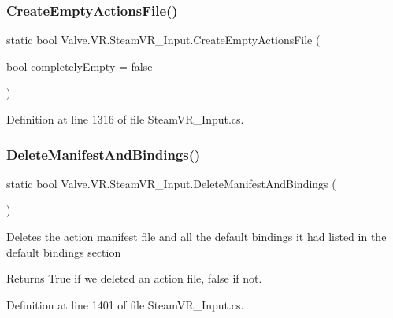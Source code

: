 \subsubsection{\texorpdfstring{CreateEmptyActionsFile()}{CreateEmptyActionsFile()}}
{\footnotesize\ttfamily static bool Valve.\+V\+R.\+Steam\+V\+R\+\_\+\+Input.\+Create\+Empty\+Actions\+File (\begin{DoxyParamCaption}\item[{bool}]{completely\+Empty = {\ttfamily false} }\end{DoxyParamCaption})\hspace{0.3cm}{\ttfamily [static]}}



Definition at line 1316 of file Steam\+V\+R\+\_\+\+Input.\+cs.

\mbox{\label{class_valve_1_1_v_r_1_1_steam_v_r___input_a8f968e5a31e70c560ee75b6f7734ca47}} 
\subsubsection{\texorpdfstring{DeleteManifestAndBindings()}{DeleteManifestAndBindings()}}
{\footnotesize\ttfamily static bool Valve.\+V\+R.\+Steam\+V\+R\+\_\+\+Input.\+Delete\+Manifest\+And\+Bindings (\begin{DoxyParamCaption}{ }\end{DoxyParamCaption})\hspace{0.3cm}{\ttfamily [static]}}



Deletes the action manifest file and all the default bindings it had listed in the default bindings section 

\begin{DoxyReturn}{Returns}
True if we deleted an action file, false if not.
\end{DoxyReturn}


Definition at line 1401 of file Steam\+V\+R\+\_\+\+Input.\+cs.

\mbox{\label{class_valve_1_1_v_r_1_1_steam_v_r___input_a8ec782e1242f6f3179c4f361f4604db6}} 
